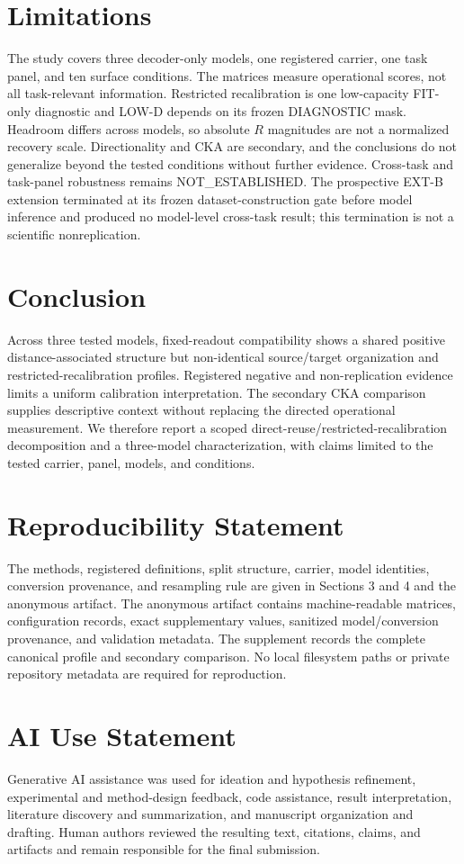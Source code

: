 \documentclass{article}
\begin{document}
\section{Limitations}
The study covers three decoder-only models, one registered carrier, one task panel, and ten surface conditions. The matrices measure operational scores, not all task-relevant information. Restricted recalibration is one low-capacity FIT-only diagnostic and LOW-D depends on its frozen DIAGNOSTIC mask. Headroom differs across models, so absolute $R$ magnitudes are not a normalized recovery scale. Directionality and CKA are secondary, and the conclusions do not generalize beyond the tested conditions without further evidence. Cross-task and task-panel robustness remains NOT\_ESTABLISHED. The prospective EXT-B extension terminated at its frozen dataset-construction gate before model inference and produced no model-level cross-task result; this termination is not a scientific nonreplication.

\section{Conclusion}
Across three tested models, fixed-readout compatibility shows a shared positive distance-associated structure but non-identical source/target organization and restricted-recalibration profiles. Registered negative and non-replication evidence limits a uniform calibration interpretation. The secondary CKA comparison supplies descriptive context without replacing the directed operational measurement. We therefore report a scoped direct-reuse/restricted-recalibration decomposition and a three-model characterization, with claims limited to the tested carrier, panel, models, and conditions.

\section*{Reproducibility Statement}
The methods, registered definitions, split structure, carrier, model identities, conversion provenance, and resampling rule are given in Sections 3 and 4 and the anonymous artifact. The anonymous artifact contains machine-readable matrices, configuration records, exact supplementary values, sanitized model/conversion provenance, and validation metadata. The supplement records the complete canonical profile and secondary comparison. No local filesystem paths or private repository metadata are required for reproduction.

\section*{AI Use Statement}
Generative AI assistance was used for ideation and hypothesis refinement, experimental and method-design feedback, code assistance, result interpretation, literature discovery and summarization, and manuscript organization and drafting. Human authors reviewed the resulting text, citations, claims, and artifacts and remain responsible for the final submission.




\appendix

\end{document}
